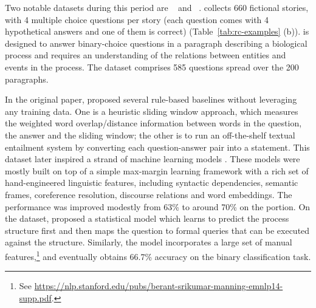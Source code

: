 Two notable datasets during this period are ~\cite{richardson2013mctest} and ~\cite{berant2014modeling}.  collects 660 fictional stories, with 4 multiple choice questions per story (each question comes with 4 hypothetical answers and one of them is correct) (Table~\ref{tab:rc-examples} (b)).  is designed to answer binary-choice questions in a paragraph describing a biological process and requires an understanding of the relations between entities and events in the process. The dataset comprises 585 questions spread over the 200 paragraphs.

In the original  paper,  proposed several rule-based baselines without leveraging any training data. One is a heuristic sliding window approach, which measures the weighted word overlap/distance information between words in the question, the answer and the sliding window; the other is to run an off-the-shelf textual entailment system by converting each question-answer pair into a statement. This dataset later inspired a strand of machine learning models \cite{sachan2015learning,narasimhan2015machine,wang2015machine}. These models were mostly built on top of a simple max-margin learning framework with a rich set of hand-engineered linguistic features, including syntactic dependencies, semantic frames, coreference resolution, discourse relations and word embeddings. The performance was improved modestly from 63\% to around 70\% on the  portion. On the  dataset,  proposed a statistical model which learns to predict the process structure first and then maps the question to formal queries that can be executed against the structure. Similarly, the model incorporates a large set of manual features,\footnote{See \href{https://nlp.stanford.edu/pubs/berant-srikumar-manning-emnlp14-supp.pdf}{https://nlp.stanford.edu/pubs/berant-srikumar-manning-emnlp14-supp.pdf}.} and eventually obtains 66.7\% accuracy on the binary classification task.

